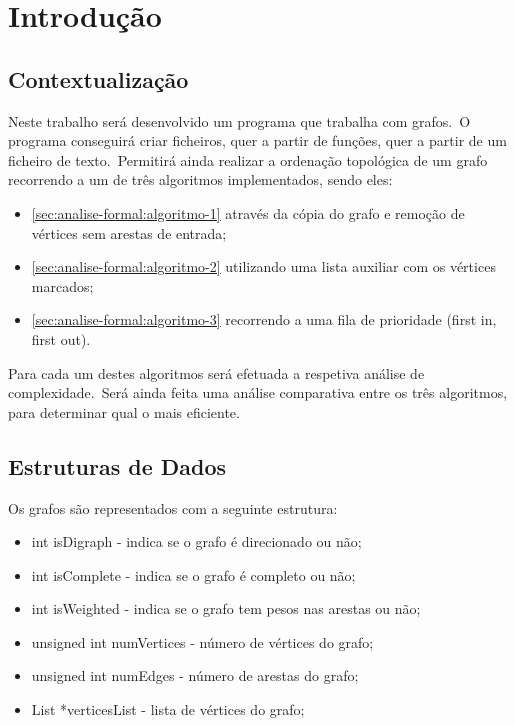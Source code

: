 
\chapter{Introdução}
\label{ch:introducao}

\section{Contextualização}
\label{sec:introducao:contextualizacao}

Neste trabalho será desenvolvido um programa que trabalha com grafos.\ O programa conseguirá criar ficheiros, quer a partir de funções, quer a partir de um ficheiro de texto.\ Permitirá ainda realizar a ordenação topológica de um grafo recorrendo a um de três algoritmos implementados, sendo eles:

\begin{itemize}
    \item \ref{sec:analise-formal:algoritmo-1} através da cópia do grafo e remoção de vértices sem arestas de entrada;
    \item \ref{sec:analise-formal:algoritmo-2} utilizando uma lista auxiliar com os vértices marcados;
    \item \ref{sec:analise-formal:algoritmo-3} recorrendo a uma fila de prioridade (first in, first out).
\end{itemize}

Para cada um destes algoritmos será efetuada a respetiva análise de complexidade.\ Será ainda feita uma análise comparativa entre os três algoritmos, para determinar qual o mais eficiente.

\section{Estruturas de Dados}
\label{sec:introducao:estruturas-de-dados}

Os grafos são representados com a seguinte estrutura:

\begin{itemize}
    \item int isDigraph - indica se o grafo é direcionado ou não;
    \item int isComplete - indica se o grafo é completo ou não;
    \item int isWeighted - indica se o grafo tem pesos nas arestas ou não;
    \item unsigned int numVertices - número de vértices do grafo;
    \item unsigned int numEdges - número de arestas do grafo;
    \item List *verticesList - lista de vértices do grafo;
\end{itemize}

